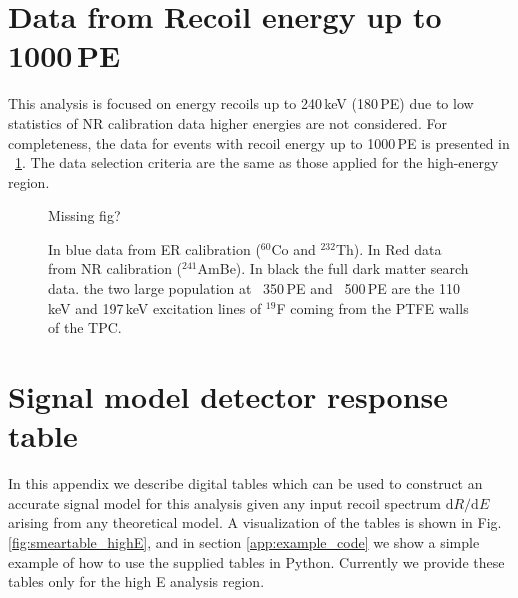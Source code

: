 \section{Data from Recoil energy up to 1000\,PE} 
\label{app:1000PE}
This analysis is focused on energy recoils up to 240\,keV (180\,PE) due to low statistics of NR calibration data higher energies are not considered. For completeness, the data for events with recoil energy up to 1000\,PE is presented in ~\ref{fig:eft_1000}. The data selection criteria are the same as those applied for the high-energy region.

\begin{figure}
Missing fig?
\caption{In blue data from ER calibration ($^{60}$Co and $^{232}$Th). In Red data from NR calibration ($^241$AmBe). In black the full dark matter search data. the two large population at ~350\,PE and ~500\,PE are the 110\,keV and 197\,keV excitation lines of $^{19}$F coming from the PTFE walls of the TPC. }
\label{fig:eft_1000}
\end{figure}  

\section{Signal model detector response table}

In this appendix we describe digital tables which can be used to construct an accurate signal model for this analysis given any input recoil spectrum $\mathrm{d}R/\mathrm{d}E$ arising from any theoretical model. A visualization of the tables is shown in Fig. \ref{fig:smeartable_highE}, and in section \ref{app:example_code} we show a simple example of how to use the supplied tables in Python. Currently we provide these tables only for the high E analysis region.

